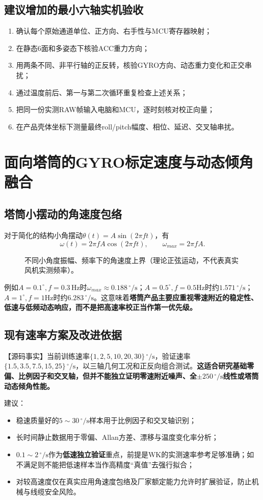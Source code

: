 \documentclass[UTF8,a4paper,11pt,oneside,openany,fontset=none]{ctexbook}
\newcommand{\dps}{\,^{\circ}/\mathrm s}
\begin{document}
\section{建议增加的最小六轴实机验收}
\begin{enumerate}
\item 确认每个原始通道单位、正方向、右手性与MCU寄存器映射；
\item 在静态6面和多姿态下核验ACC重力方向；
\item 用两条不同、非平行轴的正反转，核验GYRO方向、动态重力变化和正交串扰；
\item 通过温度前后、第一与第二次循环重复检查上述关系；
\item 把同一份实测RAW帧输入电脑和MCU，逐时刻核对校正向量；
\item 在产品壳体坐标下测量最终roll/pitch幅度、相位、延迟、交叉轴串扰。
\end{enumerate}

\chapter{面向塔筒的GYRO标定速度与动态倾角融合}
\section{塔筒小摆动的角速度包络}
对于简化的结构小角摆动$\theta(t)=A\sin(2\pi ft)$，有
\begin{equation}\omega(t)=2\pi f A\cos(2\pi ft),\qquad \omega_{max}=2\pi f A.\end{equation}
\begin{figure}[htbp]\centering\caption{不同小角度振幅、频率下的角速度上界（理论正弦运动，不代表真实风机实测频率）。}\end{figure}
例如$A=0.1^\circ,f=0.3\,\mathrm{Hz}$时$\omega_{max}\approx0.188\dps$；$A=0.5^\circ,f=0.5$Hz时约$1.571\dps$；$A=1^\circ,f=1$Hz时约$6.283\dps$。这意味着\textbf{塔筒产品主要应重视零速附近的稳定性、低速与低频动态响应，而不是把高速率校正当作第一优先级。}

\section{现有速率方案及改进依据}
【源码事实】当前训练速率$\{1,2,5,10,20,30\}\dps$，验证速率$\{1.5,3.5,7.5,15,25\}\dps$，以三轴几何工况和正反向组合测试。\textbf{这适合研究基础零偏、比例因子和交叉轴，但并不能独立证明零速附近噪声、全$\pm250\dps$线性或塔筒动态倾角性能。}

建议：
\begin{itemize}
\item 稳速质量好的$5\sim30\dps$样本用于比例因子和交叉轴识别；
\item 长时间静止数据用于零偏、Allan方差、漂移与温度变化率分析；
\item $0.1\sim2\dps$作为\textbf{低速独立验证}重点，前提是WK的实测速率参考足够准确；如不满足则不能把低速样本当作高精度“真值”去强行拟合；
\item 对较高速度仅在真实应用角速度包络及厂家额定能力允许时扩展验证，防止机械与线缆安全风险。
\end{itemize}
\end{document}
